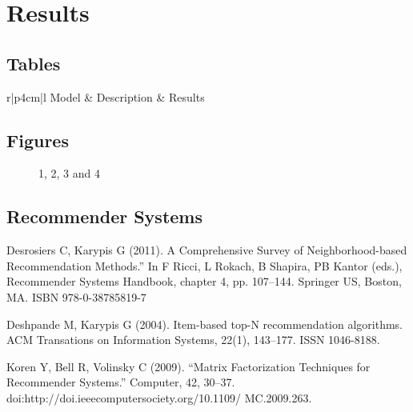 \section{Results}

\subsection{Tables}

\centering	
\begin{table}[H]\tiny
	\caption{}	
	\begin{tabular}{r|p{4cm}|l}
		\hline	
		Model & Description & Results \\
		\hline 
		\hline 
	\end{tabular}
\end{table}

\subsection{Figures}

\begin{figure}[H]
	\centering
	\begin{minipage}[b]{0.5\linewidth}
	\end{minipage}\hfill
	\begin{minipage}[b]{0.5\linewidth}
	\end{minipage}\hfill	
	\begin{minipage}[b]{0.5\linewidth}
	\end{minipage}\hfill
	\begin{minipage}[b]{0.5\linewidth}
	\end{minipage}\hfill
	\caption{1, 2, 3 and 4}
	\label{fig:Figure1}
\end{figure} 



\begin{thebibliography}{00}

\subsection{Recommender Systems}

Desrosiers C, Karypis G (2011). 
\newblock A Comprehensive Survey of Neighborhood-based Recommendation Methods.” In F Ricci, L Rokach, B Shapira, PB Kantor (eds.), 
\newblock Recommender Systems Handbook, chapter 4, pp. 107–144. Springer US, Boston, MA. ISBN 978-0-38785819-7

Deshpande M, Karypis G (2004). 
\newblock Item-based top-N recommendation algorithms.
\newblock ACM Transations on Information Systems, 22(1), 143–177. ISSN 1046-8188.

Koren Y, Bell R, Volinsky C (2009). 
\newblock “Matrix Factorization Techniques for Recommender Systems.” 
\newblock Computer, 42, 30–37. doi:http://doi.ieeecomputersociety.org/10.1109/ MC.2009.263.


\end{thebibliography}


